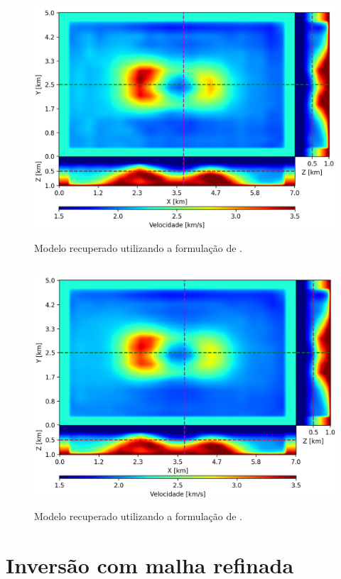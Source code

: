 \begin{figure}[H]
	\centering
	\includegraphics[width=12cm,height=9cm]{Imgs/Resultados/fim_sparse.png}
	\caption{Modelo recuperado utilizando a formulação de .}
	\label{fig:fim_sparse}	
\end{figure}


\begin{figure}[H]
	\centering
	\includegraphics[width=12cm,height=9cm]{Imgs/Resultados/fsm_sparse.png}
	\caption{Modelo recuperado utilizando a formulação de .}
	\label{fig:fsm_sparse}	
\end{figure}


\section{Inversão com malha refinada}

